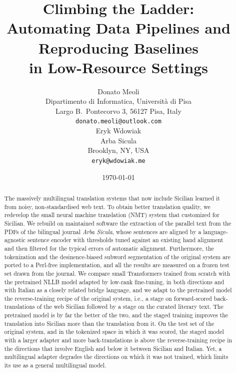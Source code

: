 \documentclass[11pt,a4paper]{article}
\title{Climbing the Ladder:\\
       Automating Data Pipelines and Reproducing Baselines\\
       in Low-Resource Settings}
\author{Donato Meoli\\
        Dipartimento di Informatica, Universit{\`a} di Pisa\\
        Largo B.~Pontecorvo 3, 56127 Pisa, Italy\\
        {\tt donato.meoli@outlook.com}\\[3ex]
        Eryk Wdowiak\\
        Arba Sicula\\
        Brooklyn, NY, USA\\
        {\tt eryk@wdowiak.me}
        }
\date{\today}
\begin{document}
\maketitle



\begin{abstract}
The massively multilingual translation systems that now include Sicilian
learned it from noisy, non-standardised web text.
To obtain better translation quality, we redevelop
the small neural machine translation (NMT) system that
\citet{wdowiak2022loresnmt} customized for Sicilian.
We rebuild on maintained software the extraction of the parallel text from the PDFs of the
bilingual journal \emph{Arba Sicula}, whose sentences are aligned by a language-agnostic sentence
encoder with thresholds tuned against an existing hand alignment and then filtered for the typical errors of automatic alignment. Furthermore, the tokenization and the desinence-biased subword segmentation of the original system are ported to a Perl-free implementation, and all the
results are measured on a frozen test set drawn from the journal. We compare small Transformers
trained from scratch with the pretrained NLLB model adapted by low-rank fine-tuning, in both
directions and with Italian as a closely related bridge language, and we adapt to the pretrained
model the reverse-training recipe of the original system, i.e., a stage on forward-scored
back-translations of the web Sicilian followed by a stage on the curated literary text. The
pretrained model is by far the better of the two, and the staged training improves the translation into Sicilian more than the translation from it. On the test set of the original system, and in the tokenized space in which it was scored, the staged model with a larger adapter and more back-translations is above the reverse-training recipe in the directions that involve English and below it between Sicilian and Italian. Yet, a multilingual adapter degrades the directions on which it was not trained, which limits its use as a general multilingual model.
\end{abstract}



\end{document}
